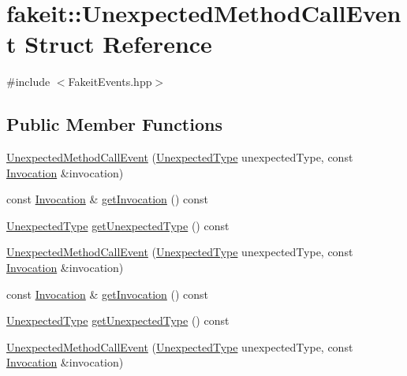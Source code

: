 \hypertarget{structfakeit_1_1UnexpectedMethodCallEvent}{}\section{fakeit\+::Unexpected\+Method\+Call\+Event Struct Reference}
\label{structfakeit_1_1UnexpectedMethodCallEvent}


{\ttfamily \#include $<$Fakeit\+Events.\+hpp$>$}

\subsection*{Public Member Functions}
\begin{DoxyCompactItemize}
\item 
\mbox{\hyperlink{structfakeit_1_1UnexpectedMethodCallEvent_a57007d208f8ad119bbc5fedb744440cc}{Unexpected\+Method\+Call\+Event}} (\mbox{\hyperlink{namespacefakeit_ae284671dc00c0fa5ee2aa4a6af02743b}{Unexpected\+Type}} unexpected\+Type, const \mbox{\hyperlink{structfakeit_1_1Invocation}{Invocation}} \&invocation)
\item 
const \mbox{\hyperlink{structfakeit_1_1Invocation}{Invocation}} \& \mbox{\hyperlink{structfakeit_1_1UnexpectedMethodCallEvent_a80a3e753a6163cecbb4d6f1b75a03f9f}{get\+Invocation}} () const
\item 
\mbox{\hyperlink{namespacefakeit_ae284671dc00c0fa5ee2aa4a6af02743b}{Unexpected\+Type}} \mbox{\hyperlink{structfakeit_1_1UnexpectedMethodCallEvent_a85b14cb613e543dff7e3c491f643ad7b}{get\+Unexpected\+Type}} () const
\item 
\mbox{\hyperlink{structfakeit_1_1UnexpectedMethodCallEvent_a57007d208f8ad119bbc5fedb744440cc}{Unexpected\+Method\+Call\+Event}} (\mbox{\hyperlink{namespacefakeit_ae284671dc00c0fa5ee2aa4a6af02743b}{Unexpected\+Type}} unexpected\+Type, const \mbox{\hyperlink{structfakeit_1_1Invocation}{Invocation}} \&invocation)
\item 
const \mbox{\hyperlink{structfakeit_1_1Invocation}{Invocation}} \& \mbox{\hyperlink{structfakeit_1_1UnexpectedMethodCallEvent_a80a3e753a6163cecbb4d6f1b75a03f9f}{get\+Invocation}} () const
\item 
\mbox{\hyperlink{namespacefakeit_ae284671dc00c0fa5ee2aa4a6af02743b}{Unexpected\+Type}} \mbox{\hyperlink{structfakeit_1_1UnexpectedMethodCallEvent_a85b14cb613e543dff7e3c491f643ad7b}{get\+Unexpected\+Type}} () const
\item 
\mbox{\hyperlink{structfakeit_1_1UnexpectedMethodCallEvent_a57007d208f8ad119bbc5fedb744440cc}{Unexpected\+Method\+Call\+Event}} (\mbox{\hyperlink{namespacefakeit_ae284671dc00c0fa5ee2aa4a6af02743b}{Unexpected\+Type}} unexpected\+Type, const \mbox{\hyperlink{structfakeit_1_1Invocation}{Invocation}} \&invocation)

\end{DoxyCompactItemize}
